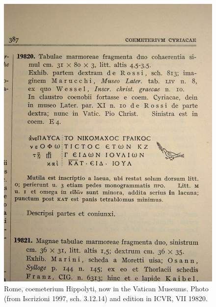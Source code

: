 \documentclass[amsthm,ebook]{saparticle}
\begin{document}
\begin{figure}[!bp]
\centering
 \includegraphics[width=\columnwidth]{FelleVisualFeaturesofinscriptionsEAGLE2016FullPaper-img003.png}
\caption{Rome, coemeterium Hippolyti, now in the Vatican Museums. Photo (from Iscrizioni 1997, sch. 3.12.14) and
edition in ICVR, VII 19820.}
\label{fig:3}
\end{figure}
\end{document}
